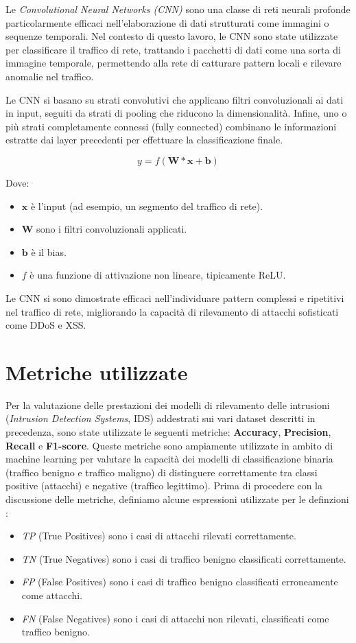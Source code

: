 Le \textit{Convolutional Neural Networks (CNN)} sono una classe di reti neurali profonde particolarmente efficaci nell'elaborazione di dati strutturati come immagini o sequenze temporali. Nel contesto di questo lavoro, le CNN sono state utilizzate per classificare il traffico di rete, trattando i pacchetti di dati come una sorta di immagine temporale, permettendo alla rete di catturare pattern locali e rilevare anomalie nel traffico.

Le CNN si basano su strati convolutivi che applicano filtri convoluzionali ai dati in input, seguiti da strati di pooling che riducono la dimensionalità. Infine, uno o più strati completamente connessi (fully connected) combinano le informazioni estratte dai layer precedenti per effettuare la classificazione finale.

\[
y = f(\mathbf{W} * \mathbf{x} + \mathbf{b})
\]

Dove:
\begin{itemize}
    \item $\mathbf{x}$ è l'input (ad esempio, un segmento del traffico di rete).
    \item $\mathbf{W}$ sono i filtri convoluzionali applicati.
    \item $\mathbf{b}$ è il bias.
    \item $f$ è una funzione di attivazione non lineare, tipicamente ReLU.
\end{itemize}

Le CNN si sono dimostrate efficaci nell'individuare pattern complessi e ripetitivi nel traffico di rete, migliorando la capacità di rilevamento di attacchi sofisticati come DDoS e XSS.\cite{CNN}

\section{Metriche utilizzate}

Per la valutazione delle prestazioni dei modelli di rilevamento delle intrusioni (\textit{Intrusion Detection Systems}, IDS) addestrati sui vari dataset descritti in precedenza, sono state utilizzate le seguenti metriche: \textbf{Accuracy}, \textbf{Precision}, \textbf{Recall} e \textbf{F1-score}. Queste metriche sono ampiamente utilizzate in ambito di machine learning per valutare la capacità dei modelli di classificazione binaria (traffico benigno e traffico maligno) di distinguere correttamente tra classi positive (attacchi) e negative (traffico legittimo).
Prima di procedere con la discussione delle metriche, definiamo alcune espressioni utilizzate per le definzioni :
\begin{itemize}
    \item \textit{TP} (True Positives) sono i casi di attacchi rilevati correttamente.
    \item \textit{TN} (True Negatives) sono i casi di traffico benigno classificati correttamente.
    \item \textit{FP} (False Positives) sono i casi di traffico benigno classificati erroneamente come attacchi.
    \item \textit{FN} (False Negatives) sono i casi di attacchi non rilevati, classificati come traffico benigno.
\end{itemize}

